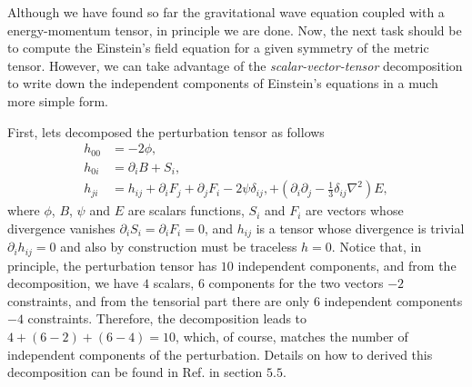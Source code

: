 \documentclass{article}
\begin{document}
Although we have found so far the gravitational wave equation coupled with a
energy-momentum tensor, in principle we are done. Now, the next task should be
to compute the Einstein's field equation for a given symmetry of the metric tensor.
However, we can take advantage of the \textit{scalar-vector-tensor} decomposition
to write down the independent components of Einstein's equations in a much more 
simple form.

First, lets decomposed the perturbation tensor as follows
\begin{align}
    h_{00} & = -2\phi, \\
    h_{0i} & = \partial_i B + S_i, \\
    h_{ji} & = h_{ij} + \partial_{i} F_{j} + \partial_{j} F_{i} - 2\psi\delta_{ij}, 
    + \left(\partial_{i}\partial_{j} - \frac{1}{3}\delta_{ij}\nabla^{2}\right)E,
\end{align}
where $\phi$, $B$, $\psi$ and $E$ are scalars functions, $S_i$ and $F_i$ 
are vectors whose divergence vanishes $\partial_{i}S_{i} = \partial_{i}F_{i} = 0$,
and $h_{ij}$ is a tensor whose divergence is trivial $\partial_{i}h_{ij} = 0$ and also
by construction must be traceless $h = 0$. Notice that, in principle, the perturbation
tensor has $10$ independent components, and from the decomposition, we have $4$ scalars,
$6$ components for the two vectors $-2$ constraints, and from the tensorial part
there are only $6$ independent components $-4$ constraints. Therefore, the decomposition
leads to $4 + \left(6 - 2\right) + \left(6 - 4\right) = 10$, which, of course, matches
the number of independent components of the perturbation. Details on how to derived this
decomposition can be found in Ref.\cite{poisson2014gravity} in section $5.5$.
\end{document}
